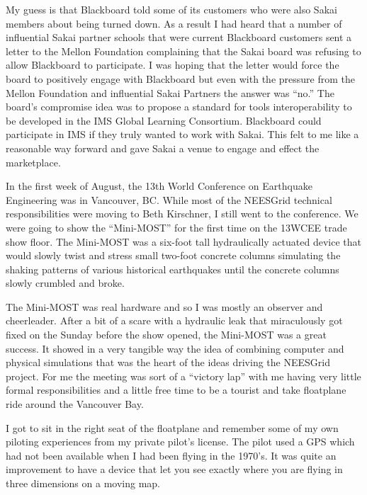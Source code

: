 \documentclass[12pt]{book}
\begin{document}
My guess is that Blackboard
told some of its customers who were also Sakai members about being turned down.
As a result I had heard that a number of influential
Sakai partner schools that were current Blackboard
customers sent a letter to the Mellon Foundation
complaining that the Sakai board was refusing to allow
Blackboard to participate.
I was hoping that the letter would force the board to
positively engage with Blackboard but even with the
pressure from the Mellon Foundation and
influential Sakai Partners the answer was ``no.''
The board's compromise idea was to propose a standard
for tools interoperability to be developed
in the IMS Global Learning
Consortium.   Blackboard could participate in IMS
if they truly wanted to work with Sakai.
This felt to me like a reasonable way forward and
gave Sakai a venue to engage and effect the marketplace.


In the first week of August, the 13th World Conference
on Earthquake Engineering was in Vancouver, BC.  While 
most of the NEESGrid technical responsibilities 
were moving to Beth Kirschner, I still went to the 
conference.  We were going to show the ``Mini-MOST'' for
the first time on the 13WCEE trade show floor.  The 
Mini-MOST was a six-foot tall hydraulically actuated device
that would slowly twist and stress small two-foot 
concrete columns simulating the shaking patterns of 
various historical earthquakes until the concrete
columns slowly crumbled and broke.

The Mini-MOST was real hardware and so I was mostly an observer
and cheerleader.   After a bit of a scare with a hydraulic leak
that miraculously got fixed on the Sunday before the show opened,
the Mini-MOST was a great success.  It showed in a very tangible
way the idea of combining computer and physical simulations that
was the heart of the ideas driving the NEESGrid project.  For me
the meeting was sort of a ``victory lap'' with me having very little 
formal responsibilities and a little free time to be a tourist and 
take floatplane ride around the Vancouver Bay.

I got to sit in the right seat of the floatplane and remember 
some of my own piloting experiences from my private pilot's license.   
The pilot used a GPS which had not been available when I had 
been flying in the 1970's.  It was quite an improvement to have a 
device that let you see exactly where you are flying in three 
dimensions on a moving map.
\end{document}
